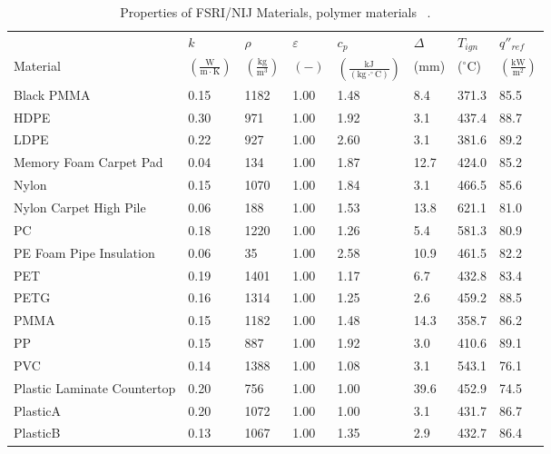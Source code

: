 \clearpage

\begin{table}[!h]
\caption[Properties of FSRI/NIJ Materials, polymer materials]{Properties of FSRI/NIJ Materials, polymer materials ~\cite{McKinnon:FSRI2023_Data}.}
\centering
\begin{tabular}{|p{5.5cm}|p{1.0cm}|p{1.0cm}|p{0.8cm}|p{1.4cm}|p{1.0cm}|p{1.0cm}|p{1.2cm}|}
\hline
                                               & $k$    & $\rho$      & $\varepsilon$   & $c_{p}$ & $\Delta$    & $T_{ign}$ & $q''_{ref}$ \\
Material                                       & $\mathrm{\left(\frac{W}{m\cdot K}\right)}$ & $\mathrm{\left(\frac{kg}{m^{3}}\right)}$ & $\mathrm{( - )}$ & $\mathrm{\left(\frac{kJ}{(kg\cdot ^{\circ}C)}\right)}$ &  ($\mathrm{mm}$)   & ($\mathrm{^{\circ}C}$) & $\mathrm{\left(\frac{kW}{m^{2}}\right)}$ \\ \hline
\hline
Black PMMA & 0.15 & 1182 & 1.00 & 1.48 & 8.4 & 371.3 & 85.5 \\ \hline 
HDPE & 0.30 & 971 & 1.00 & 1.92 & 3.1 & 437.4 & 88.7 \\ \hline 
LDPE & 0.22 & 927 & 1.00 & 2.60 & 3.1 & 381.6 & 89.2 \\ \hline 
Memory Foam Carpet Pad & 0.04 & 134 & 1.00 & 1.87 & 12.7 & 424.0 & 85.2 \\ \hline 
Nylon & 0.15 & 1070 & 1.00 & 1.84 & 3.1 & 466.5 & 85.6 \\ \hline 
Nylon Carpet High Pile & 0.06 & 188 & 1.00 & 1.53 & 13.8 & 621.1 & 81.0 \\ \hline 
PC & 0.18 & 1220 & 1.00 & 1.26 & 5.4 & 581.3 & 80.9 \\ \hline 
PE Foam Pipe Insulation & 0.06 & 35 & 1.00 & 2.58 & 10.9 & 461.5 & 82.2 \\ \hline 
PET & 0.19 & 1401 & 1.00 & 1.17 & 6.7 & 432.8 & 83.4 \\ \hline 
PETG & 0.16 & 1314 & 1.00 & 1.25 & 2.6 & 459.2 & 88.5 \\ \hline 
PMMA & 0.15 & 1182 & 1.00 & 1.48 & 14.3 & 358.7 & 86.2 \\ \hline 
PP & 0.15 & 887 & 1.00 & 1.92 & 3.0 & 410.6 & 89.1 \\ \hline 
PVC & 0.14 & 1388 & 1.00 & 1.08 & 3.1 & 543.1 & 76.1 \\ \hline 
Plastic Laminate Countertop & 0.20 & 756 & 1.00 & 1.00 & 39.6 & 452.9 & 74.5 \\ \hline 
PlasticA & 0.20 & 1072 & 1.00 & 1.00 & 3.1 & 431.7 & 86.7 \\ \hline 
PlasticB & 0.13 & 1067 & 1.00 & 1.35 & 2.9 & 432.7 & 86.4 \\ \hline 

\end{tabular}
\end{table}
